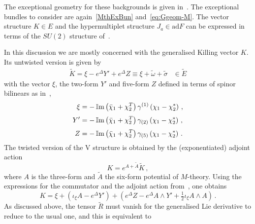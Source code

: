 \documentclass[debug]{phd}
\begin{document}
The exceptional geometry for these backgrounds is given in~\cite{AshmoreESE,Grana_Ntokos}.
The exceptional bundles to consider are again~\eqref{MthExBun} and~\eqref{eq:Ggeom-M}. 
The vector structure $K\in E$ and the hypermultiplet structure $J_a \in \mathrm{ad}F$ can be expressed in terms of the $SU(2)$ structure of~\cite{Gauntlett:2004zh}. 

In this discussion we are mostly concerned with the generalised Killing vector $K$. 
Its untwisted version is given by
%
	\begin{equation}
	\label{vecK}
		\begin{array}{cc}
			\tilde{K}=\xi -e^{\Delta} Y' + e^{\Delta} Z \equiv \xi + \tilde{\omega} + \tilde{\sigma} & \in \tilde{E} 
		\end{array}
	\end{equation}
%
with the vector $\xi$, the two-form $Y'$ and five-form $Z$ defined in terms of spinor bilinears as in~\cite{AshmoreESE}, 
%
	\begin{align}
		\label{vecbilM6}
		\xi &= -\operatorname{\mathbb{I}m} \left(\bar{\chi}_1+\chi_2^T\right)\gamma^{(1)}\left(\chi_1 - \chi_2^* \right)\, ,\\[1mm]
		\label{YbilM6}
		Y' &= -\operatorname{\mathbb{I}m} \left(\bar{\chi}_1+\chi_2^T\right)\gamma_{(2)}\left(\chi_1 - \chi_2^* \right)\, ,\\[1mm]
		\label{ZbilM6}
		Z &= -\operatorname{\mathbb{I}m} \left(\bar{\chi}_1+\chi_2^T\right) \gamma_{(5)} \left(\chi_1 - \chi_2^* \right)\, .
	\end{align}
%
The twisted version of the V structure is obtained by the (exponentiated) adjoint action
%
\begin{equation}
	K = e^{A+\tilde{A}} \tilde{K}\, ,
\end{equation}
%
where $A$ is the three-form and $\tilde{A}$ the six-form potential of $M$-theory. Using the expressions for the commutator and the adjoint action from~\cite{AshmoreECY}, one obtains~\cite{AshmoreESE} 
%
	\begin{equation}
	\label{eq:twisted_K_M}
		K= \xi + \left( \iota_{\xi}A - e^{\Delta}Y'\right) + \left( e^{\Delta} Z - e^{\Delta} A \wedge Y' + \tfrac{1}{2} \iota_{\xi} A \wedge A\right)\, .
	\end{equation}
%
As discussed above, the tensor $\tilde{R}$ must vanish for the generalised Lie derivative to reduce to the usual one, and this is equivalent to~\cite{AshmoreESE}
\end{document}
